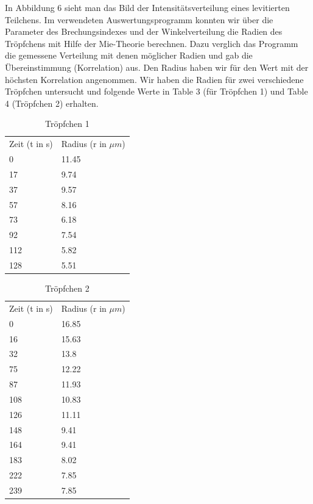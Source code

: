\documentclass[10pt,a4paper]{article}
\begin{document}
In Abbildung 6 sieht man das Bild der Intensitätsverteilung eines levitierten Teilchens. Im verwendeten Auswertungsprogramm konnten wir über die Parameter des Brechungsindexes und der Winkelverteilung die Radien des Tröpfchens mit Hilfe der Mie-Theorie berechnen. Dazu verglich das Programm die gemessene Verteilung mit denen möglicher Radien und gab die Übereinstimmung (Korrelation) aus. Den Radius haben wir für den Wert mit der höchsten Korrelation angenommen. Wir haben die Radien für zwei verschiedene Tröpfchen untersucht und folgende Werte in Table 3 (für Tröpfchen 1) und Table 4 (Tröpfchen 2) erhalten.

\begin{table}[h!]
	\centering
	\caption{Tröpfchen 1}
	\label{my-label}
	\begin{tabular}{ll}
		Zeit (t in s) & Radius (r in $\mu m$) \\
		0             & 11.45                \\
		17            & 9.74                 \\
		37            & 9.57                 \\
		57            & 8.16                 \\
		73            & 6.18                 \\
		92            & 7.54                 \\
		112           & 5.82                 \\
		128           & 5.51                
	\end{tabular}
\end{table}
\begin{table}[h!]
	\centering
	\caption{Tröpfchen 2}
	\label{my-label}
	\begin{tabular}{ll}
		Zeit (t in s) & Radius (r in $\mu m$) \\
		0             & 16.85                \\
		16            & 15.63                \\
		32            & 13.8                 \\
		75            & 12.22                \\
		87            & 11.93                \\
		108           & 10.83                \\
		126           & 11.11                \\
		148           & 9.41                 \\
		164           & 9.41                 \\
		183           & 8.02                 \\
		222           & 7.85                 \\
		239           & 7.85                
	\end{tabular}
\end{table}
\end{document}
